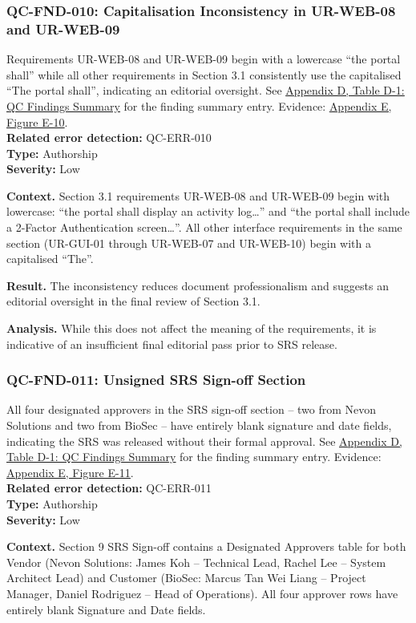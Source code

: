 \documentclass[11pt,a4paper]{article}
\let\orighyperref\hyperref
\renewcommand{\hyperref}[2][]{\orighyperref[#1]{\uline{#2}}}
\begin{document}
\subsubsection*{QC-FND-010: Capitalisation Inconsistency in UR-WEB-08 and UR-WEB-09}
Requirements UR-WEB-08 and UR-WEB-09 begin with a lowercase ``the portal shall'' while all other requirements in Section 3.1 consistently use the capitalised ``The portal shall'', indicating an editorial oversight. See \hyperref[tab:qc-findings-summary]{Appendix D, Table D-1: QC Findings Summary} for the finding summary entry. Evidence: \hyperref[fig:evidence-010]{Appendix E, Figure E-10}. \\
\textbf{Related error detection:} QC-ERR-010 \\
\textbf{Type:} Authorship \\
\textbf{Severity:} Low

\textbf{Context.} Section 3.1 requirements UR-WEB-08 and UR-WEB-09 begin with lowercase: ``the portal shall display an activity log\ldots{}'' and ``the portal shall include a 2-Factor Authentication screen\ldots{}''. All other interface requirements in the same section (UR-GUI-01 through UR-WEB-07 and UR-WEB-10) begin with a capitalised ``The''.

\textbf{Result.} The inconsistency reduces document professionalism and suggests an editorial oversight in the final review of Section 3.1.

\textbf{Analysis.} While this does not affect the meaning of the requirements, it is indicative of an insufficient final editorial pass prior to SRS release.

\subsubsection*{QC-FND-011: Unsigned SRS Sign-off Section}
All four designated approvers in the SRS sign-off section -- two from Nevon Solutions and two from BioSec -- have entirely blank signature and date fields, indicating the SRS was released without their formal approval. See \hyperref[tab:qc-findings-summary]{Appendix D, Table D-1: QC Findings Summary} for the finding summary entry. Evidence: \hyperref[fig:evidence-011]{Appendix E, Figure E-11}. \\
\textbf{Related error detection:} QC-ERR-011 \\
\textbf{Type:} Authorship \\
\textbf{Severity:} Low

\textbf{Context.} Section 9 SRS Sign-off contains a Designated Approvers table for both Vendor (Nevon Solutions: James Koh -- Technical Lead, Rachel Lee -- System Architect Lead) and Customer (BioSec: Marcus Tan Wei Liang -- Project Manager, Daniel Rodriguez -- Head of Operations). All four approver rows have entirely blank Signature and Date fields.
\end{document}
